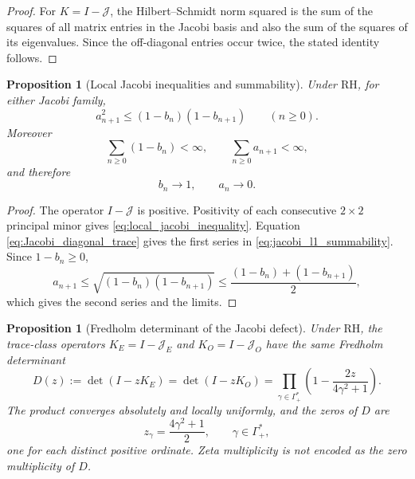 \documentclass[11pt]{amsart}
\numberwithin{equation}{section}
\theoremstyle{plain}
\newtheorem{proposition}[theorem]{Proposition}
\theoremstyle{definition}
\theoremstyle{remark}
\newcommand{\RH}{\mathrm{RH}}
\begin{document}
\begin{proof}
For $K=I-\mathcal J$, the Hilbert--Schmidt norm squared is the sum of the squares of all matrix entries in the Jacobi basis and also the sum of the squares of its eigenvalues.  Since the off-diagonal entries occur twice, the stated identity follows.
\end{proof}

\begin{proposition}[Local Jacobi inequalities and summability]
\label{prop:local_jacobi_inequalities}
Under $\RH$, for either Jacobi family,
\begin{equation}
a_{n+1}^2\le(1-b_n)(1-b_{n+1})
\qquad(n\ge0).
\label{eq:local_jacobi_inequality}
\end{equation}
Moreover
\begin{equation}
\sum_{n\ge0}(1-b_n)<\infty,
\qquad
\sum_{n\ge0}a_{n+1}<\infty,
\label{eq:jacobi_l1_summability}
\end{equation}
and therefore
\begin{equation}
b_n\longrightarrow1,
\qquad
a_n\longrightarrow0.
\label{eq:jacobi_coeff_limits}
\end{equation}
\end{proposition}

\begin{proof}
The operator $I-\mathcal J$ is positive.  Positivity of each consecutive $2\times2$ principal minor gives \eqref{eq:local_jacobi_inequality}.  Equation \eqref{eq:Jacobi_diagonal_trace} gives the first series in \eqref{eq:jacobi_l1_summability}.  Since $1-b_n\ge0$,
\begin{equation}
a_{n+1}\le\sqrt{(1-b_n)(1-b_{n+1})}
\le\frac{(1-b_n)+(1-b_{n+1})}{2},
\label{eq:an_amgm_bound}
\end{equation}
which gives the second series and the limits.
\end{proof}

\begin{proposition}[Fredholm determinant of the Jacobi defect]
\label{prop:Fredholm_determinant}
Under $\RH$, the trace-class operators $K_E=I-\mathcal J_E$ and $K_O=I-\mathcal J_O$ have the same Fredholm determinant
\begin{equation}
D(z):=\det(I-zK_E)=\det(I-zK_O)
=\prod_{\gamma\in\Gamma_+^*}
\left(1-\frac{2z}{4\gamma^2+1}\right).
\label{eq:Fredholm_product}
\end{equation}
The product converges absolutely and locally uniformly, and the zeros of $D$ are
\begin{equation}
z_\gamma=\frac{4\gamma^2+1}{2},
\qquad \gamma\in\Gamma_+^*,
\label{eq:Fredholm_zeros}
\end{equation}
one for each distinct positive ordinate.  Zeta multiplicity is not encoded as the zero multiplicity of $D$.
\end{proposition}
\end{document}
